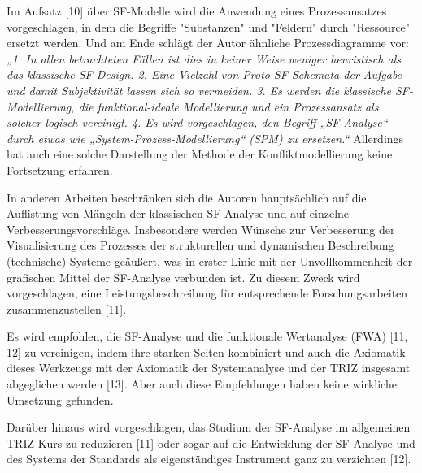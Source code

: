 \documentclass[11pt,a4paper]{article}
\begin{document}
Im Aufsatz [10] über SF-Modelle wird die Anwendung eines Prozessansatzes
vorgeschlagen, in dem die Begriffe "Substanzen" und "Feldern" durch
"Ressource" ersetzt werden. Und am Ende schlägt der Autor ähnliche
Prozessdiagramme vor: \emph{„1. In allen betrachteten Fällen ist dies in
  keiner Weise weniger heuristisch als das klassische SF-Design. 2.  Eine
  Vielzahl von Proto-SF-Schemata der Aufgabe und damit Subjektivität lassen
  sich so vermeiden. 3.  Es werden die klassische SF-Modellierung, die
  funktional-ideale Modellierung und ein Prozessansatz als solcher logisch
  vereinigt. 4. Es wird vorgeschlagen, den Begriff „SF-Analyse“ durch etwas
  wie „System-Prozess-Modellierung“ (SPM) zu ersetzen.“} Allerdings hat auch
eine solche Darstellung der Methode der Konfliktmodellierung keine Fortsetzung
erfahren.

In anderen Arbeiten beschränken sich die Autoren hauptsächlich auf die
Auflistung von Mängeln der klassischen SF-Analyse und auf einzelne
Verbesserungsvorschläge. Insbesondere werden Wünsche zur Verbesserung der
Visualisierung des Prozesses der strukturellen und dynamischen Beschreibung
(technische) Systeme geäußert, was in erster Linie mit der Unvollkommenheit
der grafischen Mittel der SF-Analyse verbunden ist. Zu diesem Zweck wird
vorgeschlagen, eine Leistungsbeschreibung für entsprechende Forschungsarbeiten
zusammenzustellen [11].

Es wird empfohlen, die SF-Analyse und die funktionale Wertanalyse (FWA) [11,
  12] zu vereinigen, indem ihre starken Seiten kombiniert und auch die
Axiomatik dieses Werkzeugs mit der Axiomatik der Systemanalyse und der TRIZ
insgesamt abgeglichen werden [13]. Aber auch diese Empfehlungen haben keine
wirkliche Umsetzung gefunden.

Darüber hinaus wird vorgeschlagen, das Studium der SF-Analyse im allgemeinen
TRIZ-Kurs zu reduzieren [11] oder sogar auf die Entwicklung der SF-Analyse und
des Systems der Standards als eigenständiges Instrument ganz zu verzichten
[12].
\end{document}
